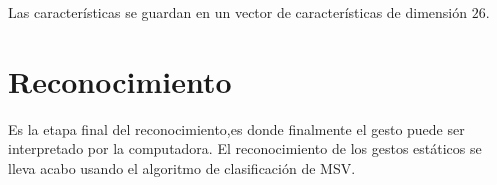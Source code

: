 Las características se guardan en un vector de características de dimensión $26$.

\section{Reconocimiento}\label{sec:ReconocimientoSystem}

Es la etapa final del reconocimiento,es donde finalmente el gesto puede ser interpretado por la computadora.   
El reconocimiento de los gestos estáticos se lleva acabo usando el algoritmo de clasificación de MSV. 




%


%
%
%
%  
	
\newpage

